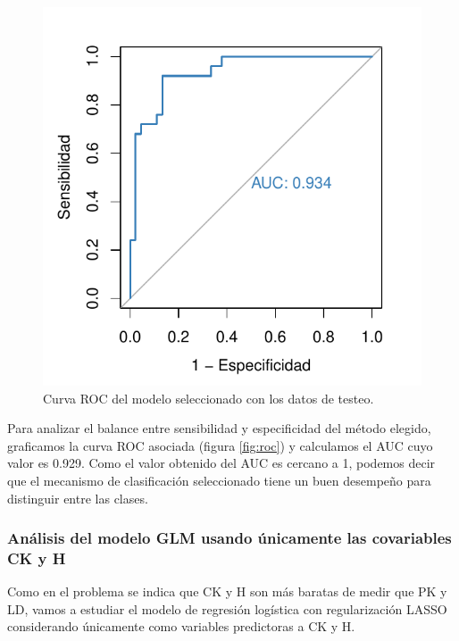 \documentclass[
]{article}
\begin{document}
\begin{figure}[H]

{\centering \includegraphics{Charaf-Spiousas_Clasificacion0_files/figure-latex/unnamed-chunk-11-1} 

}

\caption{\label{fig:roc}Curva ROC del modelo seleccionado con los datos de testeo.}\label{fig:unnamed-chunk-11}
\end{figure}

Para analizar el balance entre sensibilidad y especificidad del método
elegido, graficamos la curva ROC asociada (figura \ref{fig:roc}) y
calculamos el AUC cuyo valor es 0.929. Como el valor obtenido del AUC es
cercano a 1, podemos decir que el mecanismo de clasificación
seleccionado tiene un buen desempeño para distinguir entre las clases.

\hypertarget{anuxe1lisis-del-modelo-glm-usando-uxfanicamente-las-covariables-ck-y-h}{%
\subsubsection{Análisis del modelo GLM usando únicamente las covariables
CK y
H}\label{anuxe1lisis-del-modelo-glm-usando-uxfanicamente-las-covariables-ck-y-h}}

Como en el problema se indica que CK y H son más baratas de medir que PK
y LD, vamos a estudiar el modelo de regresión logística con
regularización LASSO considerando únicamente como variables predictoras
a CK y H.
\end{document}
